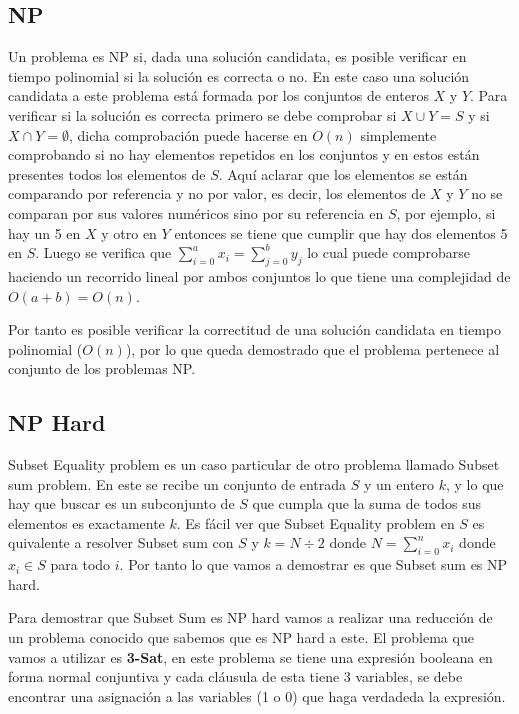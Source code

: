 \documentclass[11pt]{article}
\begin{document}
    \subsection{NP}
    Un problema es NP si, dada una solución candidata, es posible verificar en tiempo polinomial si la solución
    es correcta o no. En este caso una solución candidata a este problema está formada por los conjuntos de enteros
    $X$ y $Y$. Para verificar si la solución es correcta primero se debe comprobar si $X \cup Y = S$ y si
    $X \cap Y = \emptyset$, dicha comprobación puede hacerse en $O(n)$ simplemente comprobando si no hay elementos
    repetidos en los conjuntos y en estos están presentes todos los elementos de $S$. Aquí aclarar que los elementos
    se están comparando por referencia y no por valor, es decir, los elementos de $X$ y $Y$ no se comparan por sus 
    valores numéricos sino por su referencia en $S$, por ejemplo, si hay un 5 en $X$ y otro en $Y$ entonces 
    se tiene que cumplir que hay dos elementos 5 en $S$. Luego se verifica que $\sum_{i=0}^{a} x_i = \sum_{j=0}^b y_j$ 
    lo cual puede comprobarse haciendo un recorrido lineal por ambos conjuntos lo que tiene una complejidad de 
    $O(a+b) = O(n)$.

    Por tanto es posible verificar la correctitud de una solución candidata en tiempo polinomial ($O(n)$), por
    lo que queda demostrado que el problema pertenece al conjunto de los problemas NP.

    \subsection{NP Hard}
    Subset Equality problem es un caso particular de otro problema llamado Subset sum problem. En este se recibe un
    conjunto de entrada $S$ y un entero $k$, y lo que hay que buscar es un subconjunto de $S$ que cumpla que la suma 
    de todos sus elementos es exactamente $k$. Es fácil ver que Subset Equality problem en $S$ es quivalente a resolver 
    Subset sum con $S$ y $k = N \div 2$ donde $N = \sum_{i=0}^{n}x_i$ donde $x_i \in S$ para todo $i$. Por tanto lo que
    vamos a demostrar es que Subset sum es NP hard.
    
    Para demostrar que Subset Sum es NP hard vamos a realizar una reducción de un problema conocido que sabemos
    que es NP hard a este. El problema que vamos a utilizar es \textbf{3-Sat}, en este problema se tiene una expresión
    booleana en forma normal conjuntiva y cada cláusula de esta tiene 3 variables, se debe encontrar una asignación 
    a las variables (1 o 0) que haga verdadeda la expresión.
\end{document}
